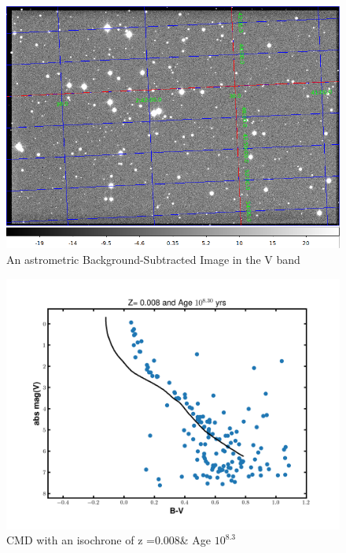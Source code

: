 \documentclass[12pt]{article}
\begin{document}
    \begin{figure}[H]
    \centering
    \includegraphics[width=\textwidth]{fig/Astrometric_Calibration_V.png}
    \caption{An astrometric Background-Subtracted Image in the V band}

    \end{figure}

    \begin{figure}[H]
    \centering
    \includegraphics[width=\textwidth]{fig/iso_z008_830.png}
    \caption{CMD with an isochrone of z =0.008\& Age $10^{8.3}$}
    \end{figure}
    
\end{document}
